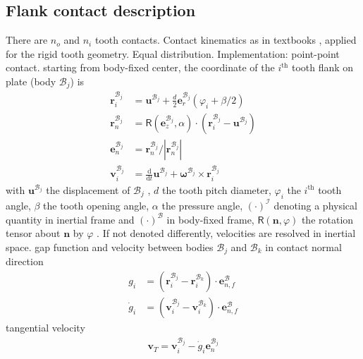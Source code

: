 \documentclass[a4paper,fleqn]{cas-dc}
\begin{document}
\subsection{Flank contact description}
There are $n_o$ and $n_i$ tooth contacts. Contact kinematics as in textbooks \cite{willner2013kontinuums}, applied for the rigid tooth geometry. 
Equal distribution. Implementation: point-point contact. 
starting from body-fixed center, the coordinate of the $i^{\textrm{th}}$ tooth flank on plate (body $\mathcal{B}_j$) is
\begin{align}
	\mathbf{r}_{i}^{\mathcal{B}_j} & = \mathbf{u}^{\mathcal{B}_j} + \frac{d}{2} \mathbf{e}_r^{\mathcal{B}_j} \left(\varphi_i+\beta/2\right) \\
	\mathbf{r}_{n}^{\mathcal{B}_j} & = \mathsf{R}(\mathbf{e}_z^{\mathcal{B}_j},\alpha)\cdot \left(\mathbf{r}_{i}^{\mathcal{B}_j}-\mathbf{u}^{\mathcal{B}_j}\right)\\
	\mathbf{e}_{n}^{\mathcal{B}_j}& = \mathbf{r}_{n}^{\mathcal{B}_j}\big/ |\mathbf{r}_{n}^{\mathcal{B}_j}|\\
	\mathbf{v}_i^{\mathcal{B}_j} & = \frac{\textrm{d}}{\textrm{d}t}\mathbf{u}^{\mathcal{B}_j} + \mathbf{\omega}^{\mathcal{B}_j}\times \mathbf{r}_i^{\mathcal{B}_j}
\end{align}
with $\boldsymbol{u}^{\mathcal{B}_j}$ the displacement of $\mathcal{B}_j$ , $d$ the tooth pitch diameter, $\varphi_i$ the $i^{\textrm{th}}$ tooth angle, $\beta$ the tooth opening angle, $\alpha$ the pressure angle, $(\cdot)^\mathcal{I}$ denoting a physical quantity in inertial frame and $(\cdot)^\mathcal{B}$ in body-fixed frame, $\mathsf{R}(\mathbf{n},\varphi)$ the rotation tensor about $\mathbf{n}$ by $\varphi$ \cite{wittenburg2016kinematics}. If not denoted differently, velocities are resolved in inertial space. gap function and velocity between bodies $\mathcal{B}_j$ and $\mathcal{B}_k$ in contact normal direction
\begin{align}
	g_i & = \left(\textbf{r}_i^{\mathcal{B}_j}-\textbf{r}_i^{\mathcal{B}_k}\right)\cdot \textbf{e}_{n,f}^{\mathcal{B}}\\
	\dot g_i & = \left(\textbf{v}_i^{\mathcal{B}_j}-\textbf{v}_i^{\mathcal{B}_k}\right)\cdot \textbf{e}_{n,f}^{\mathcal{B}}
\end{align}
tangential velocity
\begin{align}
	\mathbf{v}_T = \mathbf{v}_i^{\mathcal{B}_j}-\dot {g}_i\mathbf{e}_n^{\mathcal B_j}
\end{align}
\end{document}
